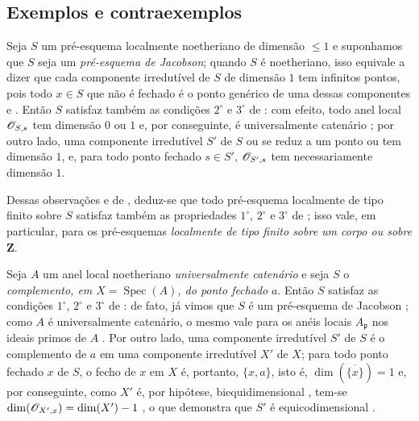 \subsection{Exemplos e contraexemplos}
\label{subsection:IV.10.7}

\begin{env}[10.7.1]
\label{IV.10.7.1}
Seja $S$ um pré-esquema localmente noetheriano de dimensão $\leq1$ e suponhamos que $S$ seja um \emph{pré-esquema de Jacobson}; quando $S$ é noetheriano, isso equivale a dizer que cada componente irredutível de $S$ de dimensão $1$ tem infinitos pontos, pois todo $x\in S$ que não é fechado é o ponto genérico de uma dessas componentes  e .
Então $S$ satisfaz também as condições $2^\circ$ e $3^\circ$ de : com efeito, todo anel local $\mathscr{O}_{S,s}$ tem dimensão $0$ ou $1$ e, por conseguinte, é universalmente catenário ; por outro lado, uma componente irredutível $S'$ de $S$ ou se reduz
a um ponto ou tem dimensão $1$, e, para todo ponto fechado $s\in S'$, $\mathscr{O}_{S',s}$ tem necessariamente dimensão $1$.

Dessas observações e de , deduz-se que todo pré-esquema localmente de tipo finito sobre $S$ satisfaz também as propriedades $1^\circ$, $2^\circ$ e $3^\circ$ de ; isso vale, em particular, para os pré-esquemas \emph{localmente de tipo finito sobre um corpo ou sobre $\mathbf Z$}.
\end{env}

\begin{env}[10.7.2]
\label{IV.10.7.2}
Seja $A$ um anel local noetheriano \emph{universalmente catenário} e seja $S$ o \emph{complemento, em $X=\operatorname{Spec}(A)$, do ponto fechado} $a$.
Então $S$ satisfaz as condições $1^\circ$, $2^\circ$ e $3^\circ$ de : de fato, já vimos que $S$ é um pré-esquema de Jacobson ; como $A$ é universalmente catenário, o mesmo vale para os anéis locais $A_{\mathfrak p}$ nos ideais primos de $A$ .
Por outro lado, uma componente irredutível $S'$ de $S$ é o complemento de $a$ em uma componente irredutível $X'$ de $X$; para todo ponto fechado $x$ de $S$, o fecho de $x$ em $X$ é, portanto, $\{x,a\}$, isto é, $\dim(\overline{\{x\}})=1$ e, por conseguinte, como $X'$ é, por hipótese, biequidimensional , tem-se $\dim(\mathscr{O}_{X',x})=\dim(X')-1$ , o que demonstra que $S'$ é equicodimensional .
\end{env}

